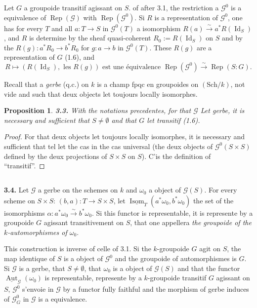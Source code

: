 \documentclass[12pt,a4paper]{article}
\theoremstyle{plain}
\newtheorem{proposition}[theorem]{Proposition}
\theoremstyle{definition}
\theoremstyle{remark}
\DeclareMathOperator{\Aut}{Aut}
\DeclareMathOperator{\Isom}{Isom}
\DeclareMathOperator{\Id}{Id}
\DeclareMathOperator{\Rep}{Rep}
\begin{document}
Let $G$ a groupoide transitif agissant on $S$. of after 3.1, the restriction a $\mathcal{G}^0$ is a equivalence of $\Rep(\mathcal{G})$ with $\Rep(\mathcal{G}^0)$. Si $R$ is a representation of $\mathcal{G}^0$, one has for every $T$ and all $a : T \to S$ in $\mathcal{G}^0(T)$ a isomorphism $R(a) \xrightarrow{\sim} a^* R(\Id_S)$, and $R$ is determine by the sheaf quasi-coherent $R_0 := R(\Id_S)$ on $S$ and by the $R(g) : a^* R_0 \to b^* R_0$ for $g : a \to b$ in $\mathcal{G}^0(T)$. These $R(g)$ are a representation of $G$ (1.6), and
\begin{equation}\label{eq:3.2.1}
R \mapsto (R(\Id_S), \text{ les } R(g)) \text{ est une équivalence } \Rep(\mathcal{G}^0) \xrightarrow{\sim} \Rep(S:G).
\end{equation}

Recall that a \emph{gerbe} (q.c.) on $k$ is a champ fpqc en groupoides on $(\mathrm{Sch}/k)$, not vide and such that deux objects let toujours locally isomorphes.

\begin{proposition}\label{prop:3.3}
\textbf{3.3.} With the notations precedentes, for that $\mathcal{G}$ Let gerbe, it is necessary and sufficient that $S \neq \emptyset$ and that $G$ let transitif (1.6).
\end{proposition}

\begin{proof}
For that deux objects let toujours locally isomorphes, it is necessary and sufficient that tel let the cas in the cas universal (the deux objects of $\mathcal{G}^0(S \times S)$ defined by the deux projections of $S \times S$ on $S$). C'is the definition of ``transitif''.
\end{proof}

\subsection{}

\textbf{3.4.} Let $\mathcal{G}$ a gerbe on the schemes on $k$ and $\omega_0$ a object of $\mathcal{G}(S)$. For every scheme on $S \times S$: $(b,a) : T \to S \times S$, let $\underline{\Isom}_T(a^*\omega_0, b^*\omega_0)$ the set of the isomorphisms $\alpha : a^*\omega_0 \xrightarrow{\sim} b^*\omega_0$. Si this functor is representable, it is represente by a groupoide $G$ agissant transitivement on $S$, that one appellera \emph{the groupoide of the $k$-automorphismes of $\omega_0$}.

This construction is inverse of celle of 3.1. Si the $k$-groupoide $G$ agit on $S$, the map identique of $S$ is a object of $\mathcal{G}^0$ and the groupoide of automorphismes is $G$. Si $\mathcal{G}$ is a gerbe, that $S \neq \emptyset$, that $\omega_0$ is a object of $\mathcal{G}(S)$ and that the functor $\underline{\Aut}_{\mathcal{G}}(\omega_0)$ is representable, represente by a $k$-groupoide transitif $G$ agissant on $S$, $\mathcal{G}^0$ s'envoie in $\mathcal{G}$ by a functor fully faithful and the morphism of gerbe induces of $\mathcal{G}^0_G$ in $\mathcal{G}$ is a equivalence.
\end{document}
